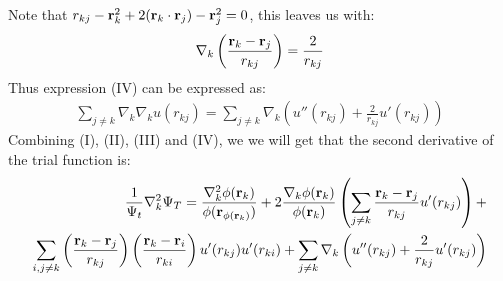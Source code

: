 \documentclass[a4paper, 10pt]{article}
\begin{document}
\begin{appendices}
Note that $r_{kj} - \bold{r}^2_{k} + 2(\bold{r}_{k}\cdot \bold{r}_{j}) - \bold{r}^2_{j} = 0$, this leaves us with:
\begin{align}
  \nabla_{k}
  \left(\frac{\bold{r}_{k} - \bold{r}_{j}}{r_{kj}}\right)
  = \frac{2}{r_{kj}}
\end{align}
Thus expression (IV) can be expressed as:
\begin{align}
  \sum_{j \neq k}\nabla_{k}\nabla_{k}u(r_{kj}) =
  \sum_{j \neq k}\nabla_{k}\left(u''(r_{kj}) + \frac{2}{r_{kj}}u'(r_{kj})
\right)
\end{align}
Combining (I), (II), (III) and (IV), we we will get that the second derivative
of the trial function is:
\begin{align}
  \begin{split}
  \frac{1}{\Psi_{t}}\nabla_{k}^2\Psi_{T} =
  \frac{\nabla_{k}^2\phi{(\bold{r}_{k})}}{\phi(\bold{r}_{\phi(\bold{r}_{k})})}
  +
  2\frac{\nabla_{k}\phi(\bold{r}_{k})}{\phi{(\bold{r}_{k})}}\left(\sum_{j\neq k}\frac{\bold{r}_{k} - \bold{r}_{j}}{r_{kj}}u'(r_{kj})\right)
  +\\
  \sum_{i, j\neq k}\left(\frac{\bold{r}_{k} - \bold{r}_{j}}{r_{kj}}\right)
  \left(\frac{\bold{r}_{k} - \bold{r}_{i}}{r_{ki}}\right)u'(r_{kj})u'(r_{ki})
  +
  \sum_{j \neq k}\nabla_{k}\left(u''(r_{kj}) + \frac{2}{r_{kj}}u'(r_{kj})\right)
\end{split}
\end{align}

\end{appendices}
\end{document}
